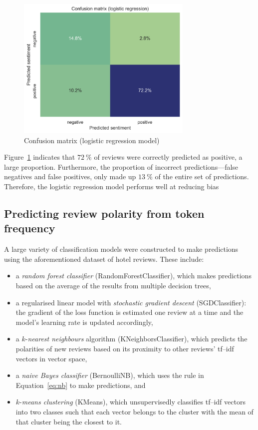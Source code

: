 \documentclass[11pt, a4paper]{pancake-article}
\begin{document}
\begin{figure}
	\begin{center}
		\includegraphics[width=0.75\textwidth]{../results/logistic_confuse.png}
	\end{center}
	\caption{Confusion matrix (logistic regression model)}\label{fig:logistic-confuse}
\end{figure}

Figure~\ref{fig:logistic-confuse} indicates that $\qty{72}{\percent}$ of reviews were correctly predicted as positive, a large proportion.
Furthermore, the proportion of incorrect predictions---false negatives and false positives, only made up
$\qty{13}{\percent}$ of the entire set of predictions. Therefore, the logistic regression model performs
well at reducing bias 

\subsection{Predicting review polarity from token frequency}

A large variety of classification models were constructed to make predictions using the aforementioned
dataset of hotel reviews. These include:

\begin{itemize}
  \item a \textit{random forest classifier} (RandomForestClassifier), which makes predictions based on the average of the results from multiple decision trees,
  \item a regularised linear model with \textit{stochastic gradient descent} (SGDClassifier): the gradient of the loss function is estimated one review at a time and the model's learning rate is updated accordingly,
  \item a $k$-\textit{nearest neighbours} algorithm (KNeighborsClassifier), which predicts the polarities of new reviews based on its proximity to other reviews' tf--idf vectors in vector space,
  \item a \textit{naive Bayes classifier} (BernoulliNB), which uses the rule in Equation~\ref{eq:nb} to make predictions, and
  \item $k$-\textit{means clustering} (KMeans), which unsupervisedly classifies tf--idf vectors into two classes such that each vector belongs to the cluster with the mean of that cluster being the closest to it.
\end{itemize}
\end{document}
